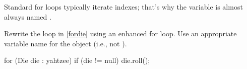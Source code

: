\begin{answer}
Standard for loops typically iterate indexes; that's why the variable is almost always named .
\end{answer}


\Q Rewrite the loop in \ref{fordie} using an enhanced for loop.
Use an appropriate variable name for the  object (i.e., not ).

\vspace{-1ex}
\begin{answer}[7em]
\begin{javaans}
for (Die die : yahtzee) {
    if (die != null) {
        die.roll();
    }
}
\end{javaans}
\end{answer}
